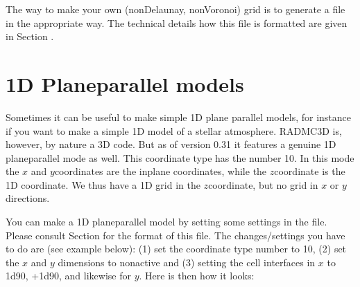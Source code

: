 \documentclass[letterpaper,10pt,english]{sphinxmanual}
\begin{document}
The way to make your own (non\sphinxhyphen{}Delaunay, non\sphinxhyphen{}Voronoi) grid is to generate
a file  in the appropriate way. The technical details
how this file is formatted are given in Section {\hyperref[\detokenize{inputoutputfiles:sec-unstr-grid}]{}}.


\section{1\sphinxhyphen{}D Plane\sphinxhyphen{}parallel models}
\label{\detokenize{gridding:d-plane-parallel-models}}\label{\detokenize{gridding:sec-1d-plane-parallel}}
Sometimes it can be useful to make simple 1\sphinxhyphen{}D plane parallel models, for
instance if you want to make a simple 1\sphinxhyphen{}D model of a stellar atmosphere.
RADMC\sphinxhyphen{}3D is, however, by nature a 3\sphinxhyphen{}D code. But as of version 0.31 it features a
genuine 1\sphinxhyphen{}D plane\sphinxhyphen{}parallel mode as well. This coordinate type has the
number 10. In this mode the \(x\)\sphinxhyphen{} and \(y\)\sphinxhyphen{}coordinates are the
in\sphinxhyphen{}plane coordinates, while the \(z\)\sphinxhyphen{}coordinate is the 1\sphinxhyphen{}D coordinate.  We
thus have a 1\sphinxhyphen{}D grid in the \(z\)\sphinxhyphen{}coordinate, but no grid in \(x\)\sphinxhyphen{} or
\(y\)\sphinxhyphen{}directions.

You can make a 1\sphinxhyphen{}D plane\sphinxhyphen{}parallel model by setting some settings in the
 file. Please consult Section {\hyperref[\detokenize{inputoutputfiles:sec-grid-input}]{}} for the
format of this file. The changes/settings you have to do are (see example
below): (1) set the coordinate type number to 10, (2) set the \(x\) and
\(y\) dimensions to non\sphinxhyphen{}active and (3) setting the cell interfaces in
\(x\) to \sphinxhyphen{}1d90, +1d90, and likewise for \(y\). Here is then how it
looks:
\end{document}
